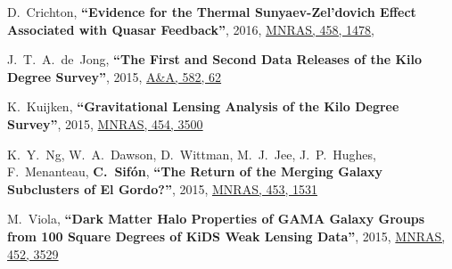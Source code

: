 \documentclass{article}
\def\myself{\textbf{\color{red} C.~Sif\'on}}
\def\aap{A\&A}
\def\mnras{MNRAS}
\newcommand{\paper}[1]{\textbf{``#1''}}
\begin{document}
\begin{etaremune}
\item
D.~Crichton, 
\paper{Evidence for the Thermal Sunyaev-Zel'dovich Effect Associated with Quasar Feedback},
2016, \href{http://adsabs.harvard.edu/abs/2016MNRAS.458.1478C}{\mnras, 458, 1478},

\item
J.~T.~A.~de~Jong, 
\paper{The First and Second Data Releases of the Kilo Degree Survey},
2015, \href{http://adsabs.harvard.edu/abs/2015A&A...582A..62D}{\aap, 582, 62}

\item
K.~Kuijken, 
\paper{Gravitational Lensing Analysis of the Kilo Degree Survey},
2015, \href{http://adsabs.harvard.edu/abs/2015MNRAS.454.3500K}{\mnras, 454, 3500}

\item
K.~Y.~Ng, W.~A.~Dawson, D.~Wittman, M.~J.~Jee, J.~P.~Hughes, F.~Menanteau, \myself,
\paper{The Return of the Merging Galaxy Subclusters of El Gordo?},
2015, \href{http://adsabs.harvard.edu/abs/2015MNRAS.453.1531N}{\mnras, 453, 1531}

\item
M.~Viola, 
\paper{Dark Matter Halo Properties of GAMA Galaxy Groups from 100 Square Degrees of KiDS Weak 
Lensing Data},
2015, \href{http://adsabs.harvard.edu/adsabs/abs/2015MNRAS.452.3528V}{\mnras, 452, 3529}


\end{etaremune}
\end{document}
